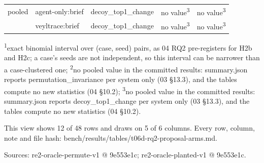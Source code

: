 \begin{table}[t]
\begin{tabularx}{\linewidth}{@{}ll>{\raggedright\arraybackslash}Xll@{}}
pooled & agent-only:brief & decoy\_top1\_change & no value\textsuperscript{3} & no value\textsuperscript{3} \\
 & veyltrace:brief & decoy\_top1\_change & no value\textsuperscript{3} & no value\textsuperscript{3} \\
\hline
\end{tabularx}
\par\smallskip\scriptsize\raggedright
\textsuperscript{1}exact binomial interval over (case, seed) pairs, as 04 RQ2 pre-registers for H2b and H2c; a case's seeds are not independent, so this interval can be narrower than a case-clustered one; \textsuperscript{2}no pooled value in the committed results: summary.json reports permutation\_invariance per system only (03 \S{}13.3), and the tables compute no new statistics (04 \S{}10.2); \textsuperscript{3}no pooled value in the committed results: summary.json reports decoy\_top1\_change per system only (03 \S{}13.3), and the tables compute no new statistics (04 \S{}10.2).\par
This view shows 12 of 48 rows and draws on 5 of 6 columns. Every row, column, note and file hash: bench/\allowbreak{}results/\allowbreak{}tables/\allowbreak{}t06d-rq2-proposal-arms.md.\par
Sources: re2-oracle-permute-v1 @ 9e553e1c; re2-oracle-planted-v1 @ 9e553e1c.\par
\end{table}
